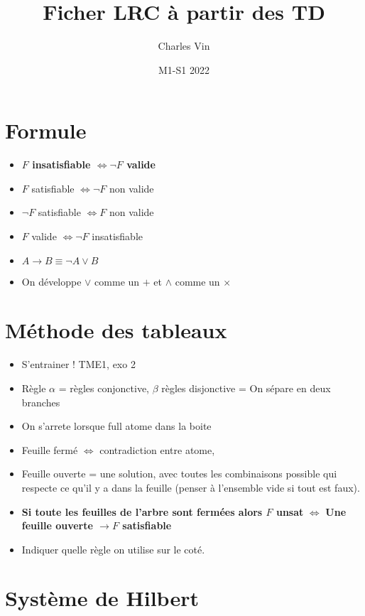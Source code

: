 \documentclass{article}
\title{Ficher LRC à partir des TD}
\author{Charles Vin}
\date{M1-S1 2022}
\theoremstyle{plain}%
\theoremstyle{definition}
\theoremstyle{remark}
\begin{document}
\maketitle

\section{Formule}
\begin{itemize}
    \item \textbf{$ F $ insatisfiable $ \Leftrightarrow \neg F$ valide}
    \item $ F $ satisfiable $ \Leftrightarrow \neg F$ non valide
    \item $ \neg F $ satisfiable $ \Leftrightarrow F$ non valide
    \item $ F $ valide $ \Leftrightarrow \neg F$ insatisfiable
    \item \textbf{$ A \to B \equiv \neg A \vee B $ }
    \item On développe $ \vee  $ comme un $ + $ et $ \wedge  $ comme un $ \times  $ 
\end{itemize}

\section{Méthode des tableaux}
\begin{itemize}
    \item S'entrainer ! TME1, exo 2
    \item Règle $ \alpha  $ = règles conjonctive, $ \beta  $ règles disjonctive = On sépare en deux branches
    \item On s'arrete lorsque full atome dans la boite
    \item Feuille fermé $ \Leftrightarrow $ contradiction entre atome, 
    \item Feuille ouverte = une solution, avec toutes les combinaisons possible qui respecte ce qu'il y a dans la feuille (penser à l'ensemble vide si tout est faux).
    \item \textbf{Si toute les feuilles de l'arbre sont fermées alors $ F $ unsat} $ \Leftrightarrow $ \textbf{Une feuille ouverte $\rightarrow F$ satisfiable}
    \item Indiquer quelle règle on utilise sur le coté.
\end{itemize}

\section{Système de Hilbert}
\end{document}
